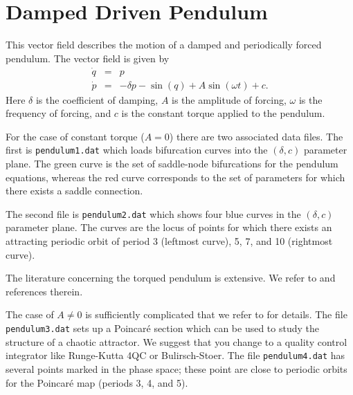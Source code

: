 \section{Damped Driven Pendulum}

        This vector field describes the motion of a damped
        and periodically forced pendulum.  
        The vector field is given by
\begin{eqnarray*}
	\dot{q} &=& p \\
	\dot{p} &=& -\delta p - \sin(q) + A \sin(\omega t) + c.
\end{eqnarray*}
Here $\delta$ is the coefficient of damping, $A$ is the amplitude of
forcing, $\omega$ is the frequency of forcing, and $c$ is the constant
torque applied to the pendulum.  

For the case of constant torque ($A=0$) there are two associated data
files.  The first is {\tt pendulum1.dat} which loads bifurcation curves
into the $(\delta, c)$ parameter plane.  The green curve is the set of
saddle-node bifurcations for the pendulum equations, whereas the red
curve corresponds to the set of parameters for which there exists a
saddle connection.  

The second file is {\tt pendulum2.dat} which shows four blue curves in the
$(\delta, c)$ parameter plane.  The curves are the locus of points for
which there exists an attracting periodic orbit of period 3 (leftmost
curve), 5, 7, and 10 (rightmost curve). 

The literature concerning the torqued pendulum is extensive.  We refer
to \cite{AVK,GH} and references therein.

The case of $A \neq 0$ is sufficiently complicated that we refer to 
\cite{GH,salamsastry} for details. 
The file {\tt pendulum3.dat} sets up a Poincar\'{e} section which can be
used to study the structure of a chaotic attractor.
We suggest that you change to a quality control integrator like
Runge-Kutta 4QC or Bulirsch-Stoer.  The file {\tt pendulum4.dat} has
several points marked in the phase space; these point are close to
periodic orbits for the Poincar\'e map (periods 3, 4, and 5).

